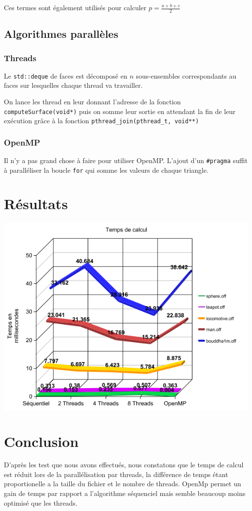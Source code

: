 \documentclass[12pt]{article}
\begin{document}
		Ces termes sont également utilisés pour calculer $\displaystyle p = \frac{a+b+c}{2}$

	\subsection{Algorithmes parallèles}
		\subsubsection{Threads}
		Le \texttt{std::deque} de faces est décomposé en $n$ sous-ensembles correspondants au faces sur lesquelles chaque thread va travailler.

		On lance les thread en leur donnant l'adresse de la fonction \texttt{computeSurface(void*)} puis on somme leur sortie en attendant la fin de leur exécution grâce à la fonction \texttt{pthread\_join(pthread\_t, void**)}

		\subsubsection{OpenMP}
		Il n'y a pas grand chose à faire pour utiliser OpenMP. L'ajout d'un \texttt{\#pragma} suffit à paralléliser la boucle \texttt{for} qui somme les valeurs de chaque triangle.

\section{Résultats}
	\begin{center}
		\includegraphics[scale = 0.7]{graph_execTime_machine1.png}
	\end{center}
\section{Conclusion}
D'après les test que nous avons effectués, nous constatons que le temps de calcul est réduit lors de la parallélisation par threads, la différence de temps étant proportionelle a la taille du fichier et le nombre de threads.
OpenMp permet un gain de temps par rapport a l'algorithme séquenciel mais semble beaucoup moins optimisé que les threads.

\newpage


\end{document}
